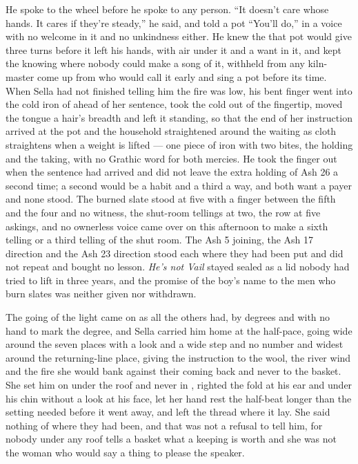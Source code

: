 He spoke to the wheel before he spoke to any person. “It doesn't care whose hands. It cares if they're steady,” he said, and told a pot “You'll do,” in a voice with no welcome in it and no unkindness either. He knew the  that pot would give three turns before it left his hands, with air under it and a want in it, and kept the knowing where nobody could make a song of it, withheld from any kiln-master come up from  who would call it early and sing a pot before its time. When Sella had not finished telling him the fire was low, his bent finger went into the cold iron of  ahead of her sentence, took the cold out of the fingertip, moved the tongue a hair's breadth and left it standing, so that the end of her instruction arrived at the pot and the household straightened around the waiting as cloth straightens when a weight is lifted --- one piece of iron with two bites, the holding and the taking, with no Grathic word for both mercies. He took the finger out when the sentence had arrived and did not leave the extra holding of Ash 26 a second time; a second would be a habit and a third a way, and both want a payer and none stood. The burned slate stood at five with a finger between the fifth and the four and no witness, the shut-room tellings at two, the row at five askings, and no ownerless voice came over  on this afternoon to make a sixth telling or a third telling of the shut room. The Ash 5 joining, the Ash 17 direction and the Ash 23 direction stood each where they had been put and did not repeat and bought no lesson. \emph{He's not Vail} stayed sealed as a lid nobody had tried to lift in three years, and the promise of the boy's name to the men who burn slates was neither given nor withdrawn.

\scenebreak

The going of the light came on as all the others had, by degrees and with no hand to mark the degree, and Sella carried him home at the half-pace, going wide around the seven places with a look and a wide step and no number and widest around the returning-line place, giving the instruction to the wool, the river wind and the fire she would bank against their coming back and never to the basket. She set him on  under the roof and never in , righted the fold at his ear and under his chin without a look at his face, let her hand rest the half-beat longer than the setting needed before it went away, and left the thread where it lay. She said nothing of where they had been, and that was not a refusal to tell him, for nobody under any roof tells a basket what a keeping is worth and she was not the woman who would say a thing to please the speaker.


